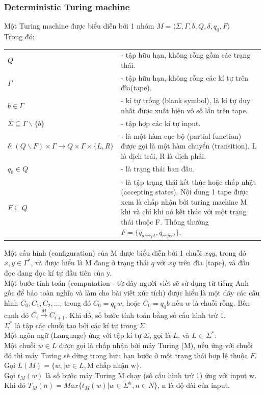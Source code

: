 \documentclass[a4paper 14pt]{extarticle}
\begin{document}
			\subsubsection{Deterministic Turing machine}
				Một Turing machine được biểu diễn bởi 1 nhóm $M = \langle \Sigma, \Gamma, b, Q, \delta, q_0, F \rangle$\\
				Trong đó:\\
				\begin{tabular}{l p{4in}}
					$Q$& - tập hữu hạn, không rỗng gồm các trạng thái.\\
					$\Gamma$& - tập hữu hạn, không rỗng các kí tự trên đĩa(tape).\\
					$b \in \Gamma$& - kí tự trống (blank symbol), là kí tự duy nhất được xuất hiện vô số lần trên tape.\\
					$\Sigma \subseteq \Gamma \backslash \{b\}$& - tập hợp các kí tự input.\\
					$\delta: (Q \backslash F) \times \Gamma \to Q \times \Gamma \times \{L, R\} $& - là một hàm cục bộ (partial function) được gọi là một hàm chuyển (transition), L là dịch trái, R là dịch phải.\\
					$q_{0} \in Q$& - là trạng thái ban đầu.\\
					$F\subseteq Q$& - là tập trạng thái kết thúc hoặc chấp nhật (accepting states). Nội dung 1 tape được xem là chấp nhận bởi turing machine M khi và chỉ khi nó kết thúc với một trạng thái thuộc F. Thông thường $F = \{q_{accept}, q_{reject}\}$.\\
				\end{tabular}  
				Một cấu hình (configuration) của M được biểu diễn bởi 1 chuỗi $xqy$, trong đó $x, y \in \Gamma^{*}$, và được hiểu là M đang ở trạng thái $q$ với $xy$ trên đĩa (tape), và đầu đọc đang đọc kí tự đầu tiên của y.\\
				Một bước tính toán (computation - từ đây người viết sẽ sử dụng từ tiếng Anh gốc để bảo toàn nghĩa và làm cho bài viết xúc tích) được hiểu là một dãy các cấu hình $C_0, C_1, C_2, \hdots$, trong đó $C_0 = q_0w$, hoặc $C_0 = q_0b$ nếu $w$ là chuỗi rỗng. Bên cạnh đó $C_i \overset{M}{\to} C_{i+1}$. Khi đó, số bước tính toán bằng số cấu hình trừ 1.\\
				$\Sigma^*$ là tập các chuỗi tạo bởi các kí tự trong $\Sigma$\\
				Một ngôn ngữ (Language) ứng với tập kí tự $\Sigma$, gọi là $L$, và $L\subset \Sigma^*$.\\
				Một chuỗi $w \in L$ được gọi là chấp nhận bởi máy Turing (M), nếu ứng với chuỗi đó thì máy Turing sẽ dừng trong hữu hạn bước ở một trạng thái hợp lệ thuộc $F$.\\
				Gọi $L(M) = \{w, | w \in L,\text{M chấp nhận w} \}$.\\
				Gọi $t_M(w)$ là số bước máy Turing M chạy (số cấu hình trừ 1) ứng với input w.\\
				Khi đó $T_M(n) = Max\{t_M(w) | w \in \Sigma^n, n \in N\}$, n là độ dài của input. 
\end{document}
